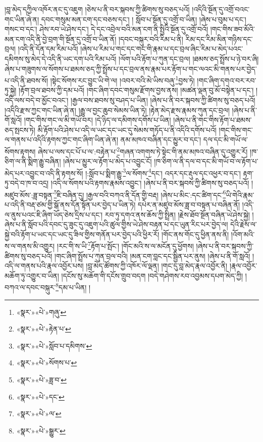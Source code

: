 །བླ་མེད་དཀྱིལ་འཁོར་ནང་དུ་འཇུག །ཅེས་པ་ནི་བར་སྐབས་ཀྱི་ཚིགས་སུ་བཅད་པའོ། །འདིའི་སྔོན་དུ་འགྲོ་བའང་གང་ཡིན་ཞེ་ན། དབང་གསུམ་མན་ངག་དང་བཅས་དང་། །
སློབ་པ་སྔོན་དུ་འགྲོ་བ་ཡིན། །ཞེས་པ་བུམ་པ་དང་། གསང་བ་དང་། ཤེས་རབ་ཡེ་ཤེས་དང་། དེ་དང་འབྲེལ་བའི་མན་ངག་ནི་སྤྱིའི་སྔོན་དུ་འགྲོ་བའོ། །གང་གིས་ཟབ་མོའི་མན་ངག་འདི་ནི་བྱེ་བྲག་གི་སྔོན་དུ་འགྲོ་བ་ཡིན་ནོ། །དབང་བསྐུར་བའི་རིམ་པ་ནི། རིམ་དང་རིམ་མིན་གཉིས་དང་བྲལ། །འདི་ནི་དོན་དམ་རིམ་པའོ། །ཞེས་པ་རིམ་པ་གང་དང་གང་གི་རྣམ་པ་དང་བྲལ་ཞིང་རིམ་པ་མེད་པའང་དམིགས་སུ་མེད་དེ་འདི་ནི་ཡང་དག་པའི་རིམ་པའོ། །ལོག་པའི་རྟོག་པ་ཀུན་དང་བྲལ། །ཐམས་ཅད་སྤྲོས་པ་ཉེ་བར་ཞི། ཞེས་པ་གཟུགས་ལ་སོགས་པ་ཐམས་ཅད་ཀྱི་སྤྲོས་པ་དང་བྲལ་ནས་རྣམ་པར་རྟོག་པ་གང་ལའང་མི་གནས་པར་བྱེད་པ་འདི་ནི་ཐབས་སོ། །སྟེང་སོགས་རང་བྱུང་ཡི་གེ་ལ། །འབར་བའི་མེ་ཡིས་བཞུ་\footnote{«སྣར་»«པེ་»གཞུ་}བྱས་ཏེ། །གང་ཞིག་དགའ་བར་རབ་ཏུ་སྐྱེ། །རྟོག་བྲལ་ཐབས་ཀྱི་དམ་པའོ། །གང་ཞིག་དབང་གསུམ་རྫོགས་བྱས་ནས། །མཚན་ལྡན་བུ་མོ་བསྟེན་པ་དང་། །འདི་ལས་བདེ་བ་མྱོང་བའང་། །རྒྱལ་བས་ཐབས་སུ་བཤད་པ་ཡིན། །ཞེས་པ་ནི་བར་སྐབས་ཀྱི་ཚིགས་སུ་བཅད་པའོ། །འདིའི་རྫས་ཀྱང་གང་ཡིན་ཞེ་ན། །རྒྱུ་ལ་བྱང་ཆུབ་སེམས་ཡིན་ཏེ། །རྟེན་མེད་རྫས་རྣམས་ཀུན་དང་བྲལ། །ཞེས་པ་ནི་གོ་སླའོ། །གང་གིས་གང་ལ་མི་གཡོ་བར། །དེ་ཉིད་ལ་དམིགས་དགོས་པ་ཡིན། །ཞེས་པ་ནི་གང་གིས་རྟོག་པ་ཐམས་ཅད་སྤངས་ཏེ། མི་རྟོག་པའི་ཤེས་པ་འདི་ལ་ཡང་དང་ཡང་དུ་སེམས་གཏོད་པ་ནི་འདིའི་དགོས་པའོ། །གང་གིས་གང་ལ་གནས་པ་འདིའི་རྟགས་ཀྱང་གང་ཞིག་ཡིན་ཞེ་ན། ནམ་མཁའ་བཞིན་དང་མྱུར་བ་དང་། དལ་དང་མི་གཡོ་ལ་སོགས་རྟགས། ཞེས་པ་ལས་དང་པོ་པ་ལ་:བརྟེན་པ་\footnote{«སྣར་»«པེ་»རྟེན་པ་}གཞན་འགགས་ཏེ་སྟེང་གི་ནམ་མཁའ་བཞིན་དུ་འགྱུར་རོ། །ཁ་ཅིག་ལ་ནི་སྨིག་རྒྱུ་བཞིན། །ཞེས་པ་མྱུར་ལ་རྟོག་པ་མེད་པ་འབྱུང་ངོ། །ཁ་ཅིག་ལ་ནི་དལ་བ་དང་མི་གཡོ་བ་ལ་རྟོག་པ་མེད་པར་འབྱུང་བ་འདི་ནི་རྟགས་སོ། །:སློབ་པ་སྨིག་རྒྱུ་\footnote{«སྣར་»«པེ་»སློབ་པ་དམིགས་}ལ་སོགས་\footnote{«སྣར་»«པེ་»སོགས་པ་}དང་། འདར་དང་རྡུལ་དང་འཕྱར་བ་དང་། རྟག་ཏུ་བདེ་བ་ཁ་བ་འདྲ། །འདི་ལ་སོགས་པའི་རྟགས་རྣམས་འབྱུང་། །ཞེས་པ་ནི་བར་སྐབས་ཀྱི་ཚིགས་སུ་བཅད་པའོ། །མཛུབ་མོས་:ཟླ་བསྟན་\footnote{«སྣར་»«པེ་»ཟླ་བ་}ཇི་བཞིན་དུ། །རྒྱལ་བའི་བཀའ་ནི་དོན་གྱི་བརྡ། །ཞེས་པ་མིང་:དང་ཚིག་དང་\footnote{«སྣར་»«པེ་»དང་}ཡི་གེའི་རྣམ་པ་འདི་ནི་བརྡ་ཙམ་གྱི་སྒོ་ནས་དོན་སྟོན་པར་བྱེད་པ་ཡིན་ཏེ། དཔེར་ན་མཛུབ་མོས་ཟླ་བ་བསྟན་པ་བཞིན་ནོ། །འདི་ལ་ནུས་པའང་ཇི་ཞིག་ཡོད་ཅེས་དྲིས་པ་དང་། རབ་ཏུ་དགའ་ནས་ཆོས་ཀྱི་སྤྲིན། །རྗེས་ཐོབ་སྔོན་བཞིན་ཡེ་ཤེས་སྐྱེ། །ཞེས་པ་ནི་སློབ་པའི་དབང་དུ་ཟུང་དུ་འཇུག་པའི་ཚུལ་གྱིས་ཡེ་ཤེས་བརྟན་པ་དང་ཡུན་རིང་པར་བྱེད་ལ། དེའི་རྗེས་ལ་སྐྱེ་བའི་རྟོག་པ་ཡང་དང་ཡང་དུ་ཟིལ་གྱིས་གནོན་པར་བྱེད་པའི་ཕྱིར་རོ། །གོང་ནས་གོང་དུ་ཕྱིན་ནས་ནི། །འོག་མའི་ས་ལ་གནས་མི་འགྱུར། །རང་གི་ས་ཡི་\footnote{«སྣར་»«པེ་»ལ་}རྟོག་པ་སྤོང་། །གོང་མའི་ས་ལ་མངོན་དུ་ཕྱོགས། །ཞེས་པ་ནི་བར་སྐབས་ཀྱི་ཚིགས་སུ་བཅད་པའོ། །གང་ཞིག་སྤྲོས་པ་ཀུན་བྲལ་བའི། །མན་ངག་བླང་དང་སྦྱིན་པར་ནུས། །ཞེས་པ་ནི་གོ་སླའོ། །འདི་ལ་གནས་པའི་རྣལ་འབྱོར་པས། །བླ་མེད་ཚོགས་ཀྱི་འཁོར་ལོ་ལྡན། །གང་དུ་བླ་མེད་རྣལ་འབྱོར་ནི། །རྣལ་འབྱོར་མཆོག་ཏུ་འགྱུར་བ་ཡིན། །དངོས་སུ་མཆོག་གི་དངོས་གྲུབ་བདག །བདེ་གཤེགས་རབ་འབྱམས་དཔག་མེད་ཀྱི། །བཀའ་ལ་དབང་བསྐུར་\footnote{«སྣར་»«པེ་»སྒྱུར་}དམ་པ་ཡིན། །
